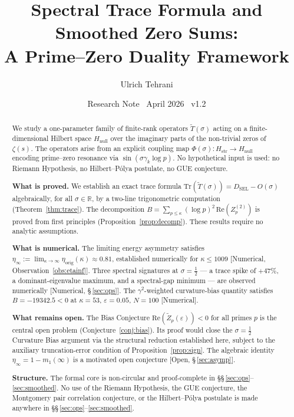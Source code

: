 \documentclass[11pt]{article}
\title{\vspace{-1.5em}\bfseries Spectral Trace Formula and Smoothed Zero Sums:\\[0.4em]
\large A Prime--Zero Duality Framework}
\author{Ulrich Tehrani}
\date{Research Note \textperiodcentered\ April 2026
      \textperiodcentered\ v1.2}
\newcommand{\Hstr}{H_{\mathrm{str}}}
\newcommand{\Hnull}{H_{\mathrm{null}}}
\newcommand{\etaorig}{\eta_{\mathrm{orig}}}
\newcommand{\Tt}{\widetilde{T}}
\newcommand{\Zt}{\widetilde{Z}}
\newcommand{\DSEL}{D_{\mathrm{SEL}}}
\begin{document}
\maketitle

\begin{abstract}
We study a one-parameter family of finite-rank operators $\Tt(\sigma)$
acting on a finite-dimensional Hilbert space $\Hnull$ over the imaginary
parts of the non-trivial zeros of $\zeta(s)$.
The operators arise from an explicit coupling map
$\Phi(\sigma)\colon\Hstr\to\Hnull$
encoding prime--zero resonance via
$\sin(\sigma\gamma_k\log p)$.
No hypothetical input is used: no Riemann Hypothesis,
no Hilbert--P\'olya postulate, no GUE conjecture.

\textbf{What is proved.}
We establish an exact trace formula
$\mathrm{Tr}(\Tt(\sigma)) = \DSEL - O(\sigma)$
algebraically, for all $\sigma\in\mathbb{R}$, by a two-line
trigonometric computation (Theorem~\ref{thm:trace}).
The decomposition $B = \sum_{p\leq\kappa}(\log p)^2\,\mathrm{Re}(Z_p^{(2)})$
is proved from first principles (Proposition~\ref{prop:decomp}).
These results require no analytic assumptions.

\textbf{What is numerical.}
The limiting energy asymmetry satisfies
$\eta_\infty := \lim_{\kappa\to\infty}\etaorig(\kappa)\approx 0.81$,
established numerically for $\kappa\leq 1009$ [Numerical,
Observation~\ref{obs:etainf}].
Three spectral signatures at $\sigma=\tfrac{1}{2}$ --- a trace spike
of $+47\%$, a dominant-eigenvalue maximum, and a spectral-gap minimum
--- are observed numerically [Numerical, \S\,\ref{sec:ops}].
The $\gamma^2$-weighted curvature-bias quantity satisfies $B = -19342.5 < 0$
at $\kappa=53$, $\varepsilon=0.05$, $N=100$ [Numerical].

\textbf{What remains open.}
The Bias Conjecture $\mathrm{Re}(\Zt_p(\varepsilon))<0$
for all primes $p$ is the central open problem (Conjecture~\ref{conj:bias}).
Its proof would close the $\sigma=\tfrac{1}{2}$ Curvature Bias argument
via the structural reduction established here,
subject to the auxiliary truncation-error condition of
Proposition~\ref{prop:sign}.
The algebraic identity $\eta_\infty = 1 - m_1(\infty)$ is a motivated
open conjecture [Open, \S\,\ref{sec:asymp}].

\textbf{Structure.}
The formal core is non-circular and proof-complete in \S\S\,\ref{sec:ops}--\ref{sec:smoothed}.
No use of the Riemann Hypothesis, the GUE conjecture,
the Montgomery pair correlation conjecture, or the Hilbert--P\'olya
postulate is made anywhere in \S\S\,\ref{sec:ops}--\ref{sec:smoothed}.
\end{abstract}
\end{document}
